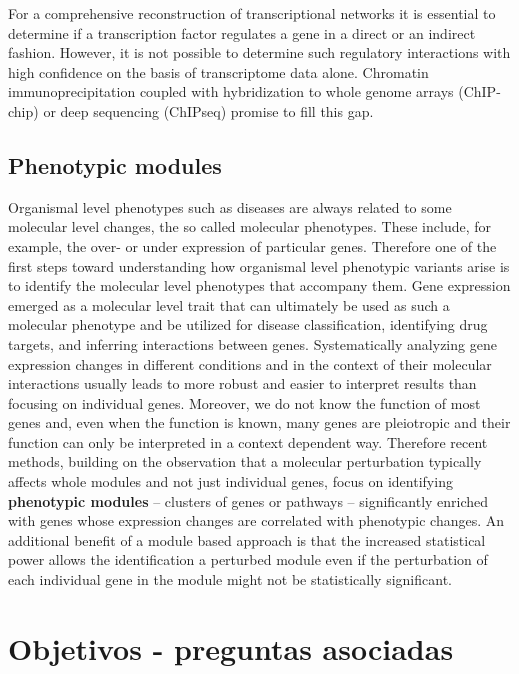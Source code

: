 \documentclass[a4paper,10pt]{article}
\begin{document}
For a comprehensive reconstruction of transcriptional networks it is essential to determine if a transcription factor regulates a gene in a direct or an indirect fashion.
However, it is not possible to determine such regulatory interactions with high confidence on the basis of transcriptome data alone. 
Chromatin immunoprecipitation coupled with hybridization to whole genome arrays (ChIP-chip) or deep sequencing (ChIPseq) promise to fill this gap.

\subsection{Phenotypic modules}
Organismal level phenotypes such as diseases are always related to some molecular level changes, the so called molecular phenotypes.
These include, for example, the over- or under expression of particular genes.
Therefore one of the first steps toward understanding how organismal level phenotypic variants arise is to identify the molecular level phenotypes that accompany them. 
Gene expression emerged as a molecular level trait that can ultimately be used as such a molecular phenotype and be utilized for disease classification, identifying drug targets, and inferring interactions between genes. 
Systematically analyzing gene expression changes in different conditions and in the context of their molecular interactions usually leads to more robust and easier to interpret results than focusing on individual genes.
Moreover, we do not know the function of most genes and, even when the function is known, many genes are pleiotropic and their function can only be interpreted in a context dependent way.
Therefore recent methods, building on the observation that a molecular perturbation typically affects whole modules and not just individual genes, focus on identifying \textbf{phenotypic modules} – clusters of genes or pathways – significantly enriched with genes whose expression changes are correlated with phenotypic changes. 
An additional benefit of a module based approach is that the increased statistical power allows the identification a perturbed module even if the perturbation of each individual gene in the module might not be statistically significant. 


\section{Objetivos - preguntas asociadas}
\end{document}
